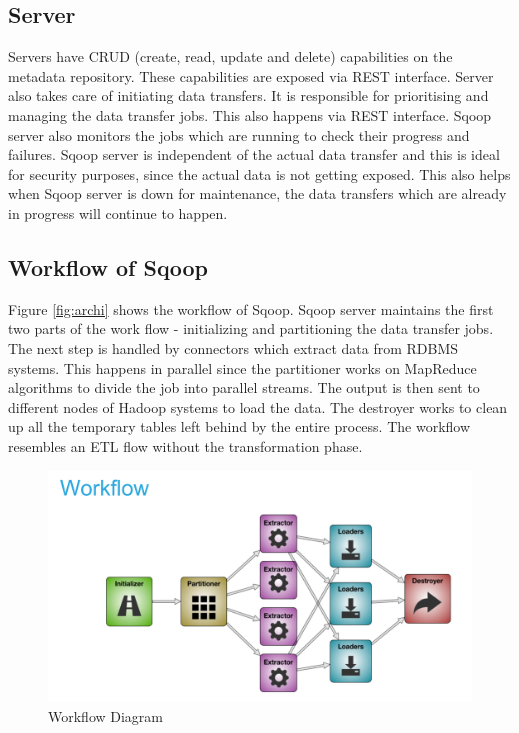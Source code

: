 \documentclass[9pt,twocolumn,twoside]{styles/osajnl}
\begin{document}
\subsection{Server}
Servers have CRUD (create, read, update and delete) capabilities on the metadata repository. These capabilities are exposed via REST interface. Server also takes care of initiating data transfers. It is responsible for prioritising and managing the data transfer jobs. This also happens via REST interface. Sqoop server also monitors the jobs which are running to check their progress and failures. Sqoop server is independent of the actual data transfer and this is ideal for security purposes, since the actual data is not getting exposed. This also helps when Sqoop server is down for maintenance, the data transfers which are already in progress will continue to happen. \subsection{Workflow of Sqoop}
Figure \ref{fig:archi} shows the workflow of Sqoop. Sqoop server maintains the first two parts of the work flow -  initializing and partitioning the data transfer jobs. The next step is handled by connectors which extract data from RDBMS systems. This happens in parallel since the partitioner works on MapReduce algorithms to divide the job into parallel streams. The output is then sent to different nodes of Hadoop systems to load the data. The destroyer works to clean up all the temporary tables left behind by the entire process. The workflow resembles an ETL flow without the transformation phase.

\begin{figure}[htbp]
\centering
\includegraphics[width=\linewidth]{images/work.png}
\caption{Workflow Diagram \cite{sqoop-blog}}
\label{fig:work}
\end{figure}
\end{document}
